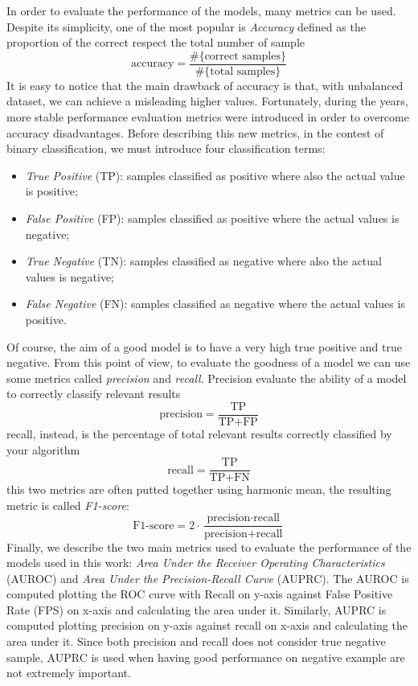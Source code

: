 In order to evaluate the performance of the models, many metrics can be used. Despite its simplicity, one of the most popular is \emph{Accuracy} defined as the proportion of the correct respect the total number of sample
\begin{equation}
    \textrm{accuracy} = \frac{\#\{\textrm{correct samples}\}}{\#\{\textrm{total samples}\}}
\end{equation}
It is easy to notice that the main drawback of accuracy is that, with unbalanced dataset, we can achieve a misleading higher values. Fortunately, during the years, more stable performance evaluation metrics were introduced in order to overcome accuracy disadvantages. Before describing this new metrics, in the contest of binary classification, we must introduce four classification terms: 
\begin{itemize}
\item \emph{True Positive} (TP): samples classified as positive where also the actual value is positive;
\item \emph{False Positive} (FP): samples classified as positive where the actual values is negative;
\item \emph{True Negative} (TN): samples classified as negative where also the actual values is negative;
\item \emph{False Negative} (FN): samples classified as negative where the actual values is positive.
\end{itemize}
Of course, the aim of a good model is to have a very high true positive and true negative. From this point of view, to evaluate the goodness of a model we can use some metrics called \emph{precision} and \emph{recall}. Precision evaluate the ability of a model to correctly classify relevant results
\begin{equation}
    \textrm{precision} = \frac{\textrm{TP}}{\textrm{TP}+\textrm{FP}}
\end{equation}
recall, instead, is the percentage of total relevant results correctly classified by your algorithm 
\begin{equation}
    \textrm{recall} = \frac{\textrm{TP}}{\textrm{TP}+\textrm{FN}}
\end{equation}
this two metrics are often putted together using harmonic mean, the resulting metric is called \emph{F1-score}:
\begin{equation}
    \textrm{F1-score} = 2 \cdot \frac{\textrm{precision} \cdot \textrm{recall}}{\textrm{precision}+\textrm{recall}}
\end{equation}
Finally, we describe the two main metrics used to evaluate the performance of the models used in this work: \emph{Area Under the Receiver Operating Characteristics} (AUROC) and \emph{Area Under the Precision-Recall Curve} (AUPRC). 
The AUROC is computed plotting the ROC curve with Recall on y-axis against False Positive Rate (FPS) on x-axis and calculating the area under it.  Similarly, AUPRC is computed plotting precision on y-axis against recall on x-axis and calculating the area under it. Since both precision and recall does not consider true negative sample, AUPRC is used when having good performance on negative example are not extremely important. 